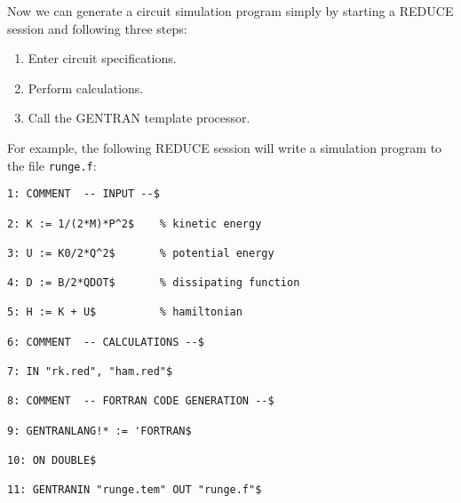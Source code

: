 
Now we can generate a circuit simulation program simply by starting
a REDUCE session and following three steps:
\begin{enumerate}
\item Enter circuit specifications.
\item Perform calculations.
\item Call the GENTRAN template processor.
\end{enumerate}
For example, the following REDUCE session will write a simulation
program to the file {\tt runge.f}:
\begin{verbatim}
1: COMMENT  -- INPUT --$ 

2: K := 1/(2*M)*P^2$    % kinetic energy 

3: U := K0/2*Q^2$       % potential energy 

4: D := B/2*QDOT$       % dissipating function 

5: H := K + U$          % hamiltonian 

6: COMMENT  -- CALCULATIONS --$ 

7: IN "rk.red", "ham.red"$ 

8: COMMENT  -- FORTRAN CODE GENERATION --$ 

9: GENTRANLANG!* := 'FORTRAN$ 

10: ON DOUBLE$

11: GENTRANIN "runge.tem" OUT "runge.f"$ 
\end{verbatim}

